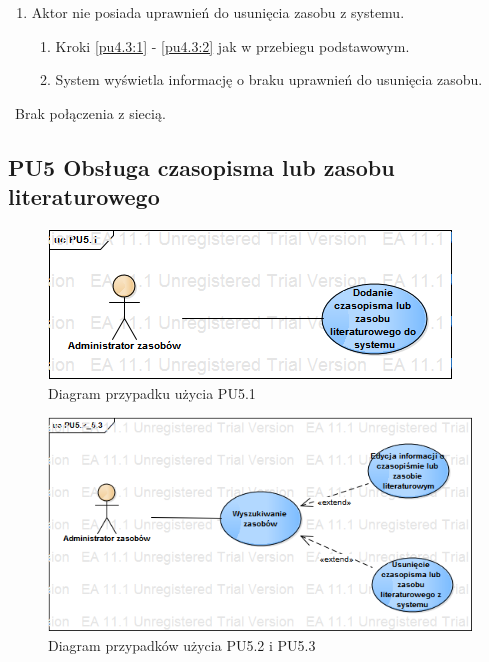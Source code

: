 \begin{enumerate}
\item Aktor nie posiada uprawnień do usunięcia zasobu z systemu.
	\begin{enumerate}[label*=\arabic*.]
		\item Kroki \ref{pu4.3:1} - \ref{pu4.3:2} jak w przebiegu podstawowym.
		\item System wyświetla informację o braku uprawnień do usunięcia zasobu.
	\end{enumerate}
\end{enumerate}

\
Brak połączenia z siecią.

\subsection{PU5 Obsługa czasopisma lub zasobu literaturowego} \label{pu5}

\begin{figure}[h!]
	\centering
	\includegraphics[scale=0.6]{img/diagrams/useCaseDiagrams/PU5_1.png}
	\caption{Diagram przypadku użycia PU5.1 \label{fig:labelUCPU5.1}}
\end{figure}

\begin{figure}[h!]
	\centering
	\includegraphics[scale=0.6]{img/diagrams/useCaseDiagrams/PU5_2_5_3.png}
	\caption{Diagram przypadków użycia PU5.2 i PU5.3 \label{fig:labelUCPU5.2_5.3}}
\end{figure}

